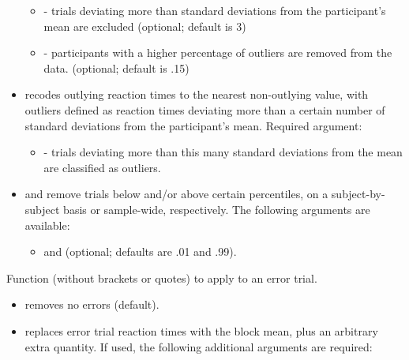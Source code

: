 \documentclass[a4paper]{book}
\begin{document}
\begin{Arguments}
\begin{ldescription}
\begin{itemize}
\begin{itemize}
\item{}  - trials deviating more than  standard deviations from the participant's mean are excluded (optional; default is 3)
\item{}  - participants with a higher percentage of outliers are removed from the data. (optional; default is .15)

\end{itemize}

\item{}  recodes outlying reaction times to the nearest non-outlying value,
with outliers defined as reaction times deviating more than a certain number of standard deviations from the participant's mean. Required argument:
\begin{itemize}

\item{}  - trials deviating more than this many standard deviations from the mean are classified as outliers.

\end{itemize}

\item{}  and  remove trials below and/or above certain percentiles,
on a subject-by-subject basis or sample-wide, respectively. The following arguments are available:
\begin{itemize}

\item{}  and  (optional; defaults are .01 and .99).

\end{itemize}


\end{itemize}


\item[\code{errortrialfunc}] Function (without brackets or quotes) to apply to an error trial.

\begin{itemize}

\item{}  removes no errors (default).
\item{}  replaces error trial reaction times with the block mean, plus an arbitrary extra quantity.
If used, the following additional arguments are required:
\begin{itemize}


\end{itemize}
\end{itemize}
\end{ldescription}
\end{Arguments}
\end{document}
